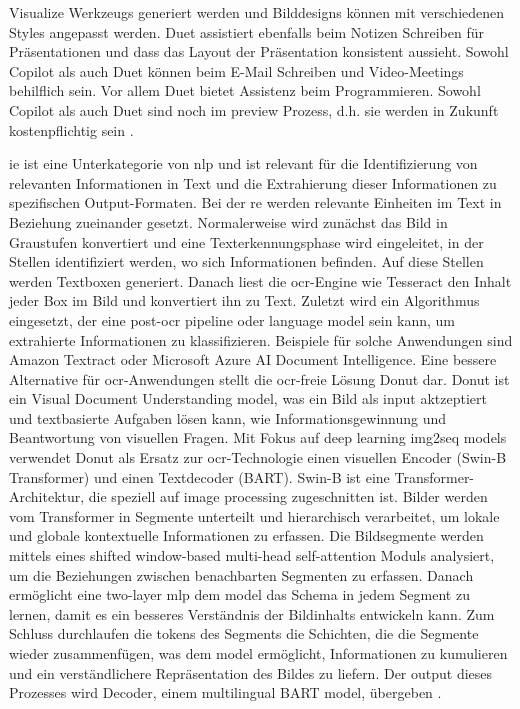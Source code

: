 Visualize Werkzeugs generiert werden und Bilddesigns können mit verschiedenen Styles angepasst werden. Duet assistiert ebenfalls beim Notizen Schreiben für Präsentationen und dass das Layout der Präsentation konsistent aussieht. Sowohl Copilot als auch Duet können beim E-Mail Schreiben und Video-Meetings behilflich sein. Vor allem Duet bietet Assistenz beim Programmieren. Sowohl Copilot als auch Duet sind noch im preview Prozess, d.h. sie werden in Zukunft kostenpflichtig sein \cite{copilot-duet}. 

\gls{ie} ist eine Unterkategorie von \gls{nlp} und ist relevant für die Identifizierung von relevanten Informationen in Text und die Extrahierung dieser Informationen zu spezifischen Output-Formaten. Bei der \gls{re} werden relevante Einheiten im Text in Beziehung zueinander gesetzt. Normalerweise wird zunächst das Bild in Graustufen konvertiert und eine Texterkennungsphase wird eingeleitet, in der Stellen identifiziert werden, wo sich Informationen befinden. Auf diese Stellen werden Textboxen generiert. Danach liest die \gls{ocr}-Engine wie Tesseract den Inhalt jeder Box im Bild und konvertiert ihn zu Text. Zuletzt wird ein Algorithmus eingesetzt, der eine post-\gls{ocr} pipeline oder language model sein kann, um extrahierte Informationen zu klassifizieren. Beispiele für solche Anwendungen sind Amazon Textract oder Microsoft Azure AI Document Intelligence. Eine bessere Alternative für \gls{ocr}-Anwendungen stellt die \gls{ocr}-freie Lösung Donut dar. Donut ist ein Visual Document Understanding model, was ein Bild als input aktzeptiert und textbasierte Aufgaben lösen kann, wie Informationsgewinnung und Beantwortung von visuellen Fragen. Mit Fokus auf deep learning img2seq models verwendet Donut als Ersatz zur \gls{ocr}-Technologie einen visuellen Encoder (Swin-B Transformer) und einen Textdecoder (BART). Swin-B ist eine Transformer-Architektur, die speziell auf image processing zugeschnitten ist. Bilder werden vom Transformer in Segmente unterteilt und hierarchisch verarbeitet, um lokale und globale kontextuelle Informationen zu erfassen. Die Bildsegmente werden mittels eines shifted window-based multi-head self-attention Moduls analysiert, um die Beziehungen zwischen benachbarten Segmenten zu erfassen. Danach ermöglicht eine two-layer \gls{mlp} dem model das Schema in jedem Segment zu lernen, damit es ein besseres Verständnis der Bildinhalts entwickeln kann. Zum Schluss durchlaufen die tokens des Segments die Schichten, die die Segmente wieder zusammenfügen, was dem model ermöglicht, Informationen zu kumulieren und ein verständlichere Repräsentation des Bildes zu liefern. Der output dieses Prozesses wird Decoder, einem multilingual BART model, übergeben \cite{transformers-ocr}. \\

